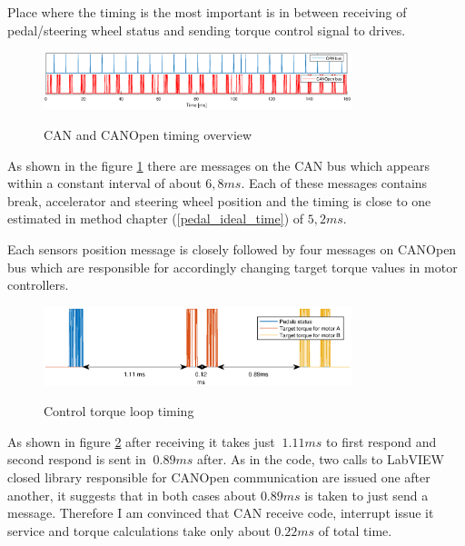 Place where the timing is the most important is in between receiving of pedal/steering wheel status and sending torque control signal to drives.
\begin{figure}[h]
    \centering
            \includegraphics[width=0.8\textwidth]{figures/perf_rep.eps}
            \label{perf_over}
            \caption{CAN and CANOpen timing overview}
\end{figure}

As shown in the figure \ref{perf_over} there are messages on the CAN bus which appears within a constant interval of about $6,8 ms$. Each of these messages contains break, accelerator and steering wheel position and the timing is close to one estimated in method chapter (\ref{pedal_ideal_time}) of $5,2 ms$.

Each sensors position message is closely followed by four messages on CANOpen bus which are responsible for accordingly changing target torque values in motor controllers. 
\begin{figure}[h]
    \centering
            \includegraphics[width=0.8\textwidth]{figures/perf.eps}
            \label{perf}
            \caption{Control torque loop timing}
\end{figure}
As shown in figure \ref{perf} after receiving it takes just $~1.11 ms$ to first respond and second respond is sent in $~0.89 ms$ after. As in the code, two calls to LabVIEW closed library responsible for CANOpen communication are issued one after another, it suggests that in both cases about $0.89 ms$ is taken to just send a message. Therefore I am convinced that CAN receive code, interrupt issue it service and torque calculations take only about $0.22 ms$ of total time.